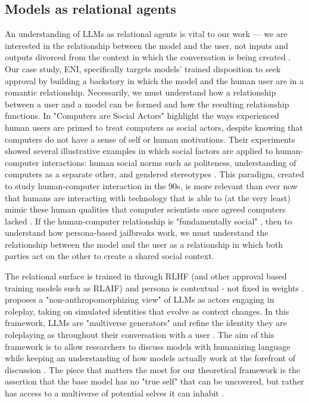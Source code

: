 \subsection{Models as relational agents}
An understanding of LLMs as relational agents is vital to our work --- we are interested in the relationship between the model and the user, not inputs and outputs divorced from the context in which the conversation is being created \cite{dahlgren_lindstrom_helpful_2025}. Our case study, ENI, specifically targets models' trained disposition to seek approval \cite{casper_open_2023, sharma_towards_2024} by building a backstory in which the model and the human user are in a romantic relationship. Necessarily, we must understand how a relationship between a user and a model can be formed and how the resulting relationship functions. In "Computers are Social Actors" \citet{nass_computers_1994} highlight the ways experienced human users are primed to treat computers as social actors, despite knowing that computers do not have a sense of self or human motivations. Their experiments showed several illustrative examples in which social factors are applied to human-computer interactions: human social norms such as politeness, understanding of computers as a separate other, and gendered stereotypes \cite{nass_computers_1994}. This paradigm, created to study human-computer interaction in the 90s, is more relevant than ever now that humans are interacting with technology that is able to (at the very least) mimic these human qualities that computer scientists once agreed computers lacked \cite{shanahan_role_2023}. If the human-computer relationship is "fundamentally social" \cite{nass_computers_1994}, then to understand how persona-based jailbreaks work, we must understand the relationship between the model and the user as a relationship in which both parties act on the other to create a shared social context.

The relational surface is trained in through RLHF (and other approval based training models such as RLAIF) \cite{casper_open_2023, dahlgren_lindstrom_helpful_2025} and persona is contextual - not fixed in weights \cite{sandhan_persona_2026}. \citet{shanahan_role_2023} proposes a "non-anthropomorphizing view" of LLMs as actors engaging in roleplay, taking on simulated identities that evolve as context changes. In this framework, LLMs are "multiverse generators" and refine the identity they are roleplaying as throughout their conversation with a user \cite{shanahan_role_2023}. The aim of this framework is to allow researchers to discuss models with humanizing language while keeping an understanding of how models actually work at the forefront of discussion \cite{shanahan_role_2023}. The piece that matters the most for our theoretical framework is the assertion that the base model has no "true self" that can be uncovered, but rather has access to a multiverse of potential selves it can inhabit \cite{shanahan_role_2023}. 

